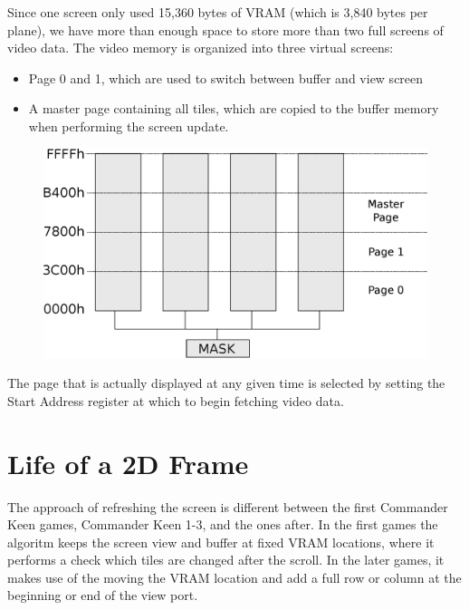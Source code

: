 \documentclass[book.tex]{subfiles}
\begin{document}
Since one screen only used 15,360 bytes of VRAM (which is 3,840 bytes per plane), we have more than enough space to store more than two full screens of video data. The video memory is organized into three virtual screens:
\begin{itemize}
\item Page 0 and 1, which are used to switch between buffer and view screen
\item A master page containing all tiles, which are copied to the buffer memory when performing the screen update.
\end{itemize}
\par

\begin{figure}[H]
\centering
\includegraphics[width=\textwidth]{imgs/drawings/ega_ram_architecture.eps}
\label{fig:ega_ram_arch}
\end{figure}

The page that is actually displayed at any given time is selected by setting the Start Address register at which to begin fetching video data.\\




\section{Life of a 2D Frame}
The approach of refreshing the screen is different between the first Commander Keen games, Commander Keen 1-3, and the ones after. In the first games the algoritm keeps the screen view and buffer at fixed VRAM locations, where it performs a check which tiles are changed after the scroll. In the later games, it makes use of the moving the VRAM location and add a full row or column at the beginning or end of the view port. 
\\
\end{document}

